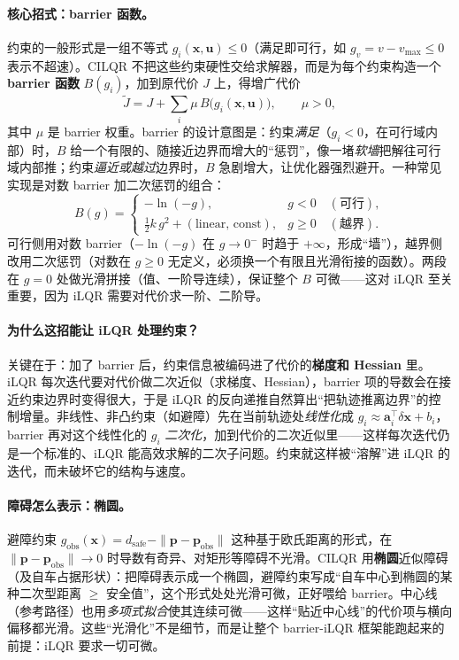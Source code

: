 \paragraph{核心招式：barrier 函数。}
约束的一般形式是一组不等式 $g_i(\mathbf x,\mathbf u)\le 0$（满足即可行，如 $g_v=v-v_{\max}\le 0$ 表示不超速）。CILQR 不把这些约束硬性交给求解器，而是为每个约束构造一个 \textbf{barrier 函数} $B(g_i)$，加到原代价 $J$ 上，得增广代价
\begin{equation}
  \tilde J = J + \sum_i \mu\, B\big(g_i(\mathbf x,\mathbf u)\big),\qquad \mu>0,
  \label{eq:st-augcost}
\end{equation}
其中 $\mu$ 是 barrier 权重。barrier 的设计意图是：约束\emph{满足}（$g_i<0$，在可行域内部）时，$B$ 给一个有限的、随接近边界而增大的“惩罚”，像一堵\emph{软墙}把解往可行域内部推；约束\emph{逼近或越过}边界时，$B$ 急剧增大，让优化器强烈避开。一种常见实现是对数 barrier 加二次惩罚的组合\cite{chen2017cilqr}：
\begin{equation}
  B(g)=
  \begin{cases}
    -\ln(-g), & g<0 \quad(\text{可行}),\\[4pt]
    \tfrac12 k\,g^2+(\text{linear, const}), & g\ge 0 \quad(\text{越界}).
  \end{cases}
  \label{eq:st-barrier}
\end{equation}
可行侧用对数 barrier（$-\ln(-g)$ 在 $g\to 0^-$ 时趋于 $+\infty$，形成“墙”），越界侧改用二次惩罚（对数在 $g\ge 0$ 无定义，必须换一个有限且光滑衔接的函数）。两段在 $g=0$ 处做光滑拼接（值、一阶导连续），保证整个 $B$ 可微——这对 iLQR 至关重要，因为 iLQR 需要对代价求一阶、二阶导。

\paragraph{为什么这招能让 iLQR 处理约束？}
关键在于：加了 barrier 后，约束信息被编码进了代价的\textbf{梯度和 Hessian} 里。iLQR 每次迭代要对代价做二次近似（求梯度、Hessian），barrier 项的导数会在接近约束边界时变得很大，于是 iLQR 的反向递推自然算出“把轨迹推离边界”的控制增量。非线性、非凸约束（如避障）先在当前轨迹处\emph{线性化}成 $g_i\approx \mathbf a_i^\top\delta\mathbf x+b_i$，barrier 再对这个线性化的 $g_i$ \emph{二次化}，加到代价的二次近似里——这样每次迭代仍是一个标准的、iLQR 能高效求解的二次子问题。约束就这样被“溶解”进 iLQR 的迭代，而未破坏它的结构与速度。

\paragraph{障碍怎么表示：椭圆。}
避障约束 $g_{\text{obs}}(\mathbf x)=d_{\text{safe}}-\|\mathbf p-\mathbf p_{\text{obs}}\|$ 这种基于欧氏距离的形式，在 $\|\mathbf p-\mathbf p_{\text{obs}}\|\to 0$ 时导数有奇异、对矩形等障碍不光滑。CILQR 用\textbf{椭圆}近似障碍（及自车占据形状）：把障碍表示成一个椭圆，避障约束写成“自车中心到椭圆的某种二次型距离 $\ge$ 安全值”，这个形式处处光滑可微，正好喂给 barrier\cite{chen2017cilqr}。中心线（参考路径）也用\emph{多项式拟合}使其连续可微——这样“贴近中心线”的代价项与横向偏移都光滑。这些“光滑化”不是细节，而是让整个 barrier-iLQR 框架能跑起来的前提：iLQR 要求一切可微。

